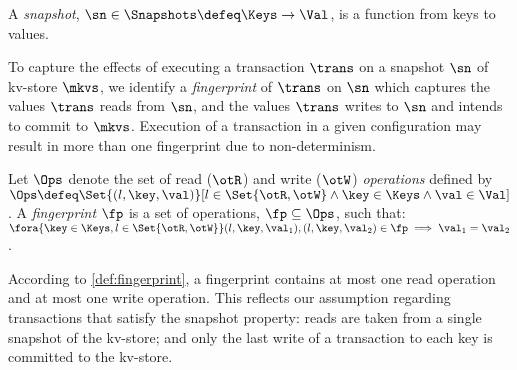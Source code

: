 \begin{definition}[Snapshots]
\label{def:heaps}
A \emph{snapshot}, \( \sn \in \Snapshots \defeq \Keys \to
\Val\),  is a function from keys to values.
\end{definition}


To capture the effects of executing a transaction $\trans$ on a snapshot $\sn$ of kv-store $\mkvs$, 
we identify a \emph{fingerprint}  of $\trans$ on $\sn$ which captures
 the values $\trans$ reads from $\sn$, and
the values $\trans$ writes to $\sn$ and intends to commit to $\mkvs$. 
Execution of a transaction in a given configuration may result in more than one fingerprint due to non-determinism. 

\begin{definition}[Fingerprints]
\label{beebop}
\label{def:fingerprint}
Let \( \Ops\) denote the set of read (\( \otR\)) and write (\(\otW\)) \emph{operations} defined by 
$\Ops \defeq \Set{(l, \key, \val) }[ l \in \Set{\otR, \otW} \land \key \in \Keys \land \val \in \Val ]$.
A \emph{fingerprint} $\fp$ is a set of operations, $\fp \subseteq \Ops$,
such that: 
$\fora{\key \in \Keys, l  \in \Set{\otR, \otW}}
	(l, \key, \val_1), (l, \key, \val_2) \in \fp \implies \val_1 = \val_2$.
\end{definition}
\noindent 
According to \cref{def:fingerprint}, a fingerprint contains at most one read operation and at most one write operation. 
This reflects our assumption regarding transactions that satisfy the snapshot property: reads are taken from a single snapshot of the kv-store;
and 
only the last write of a transaction to each key is committed to the kv-store.
